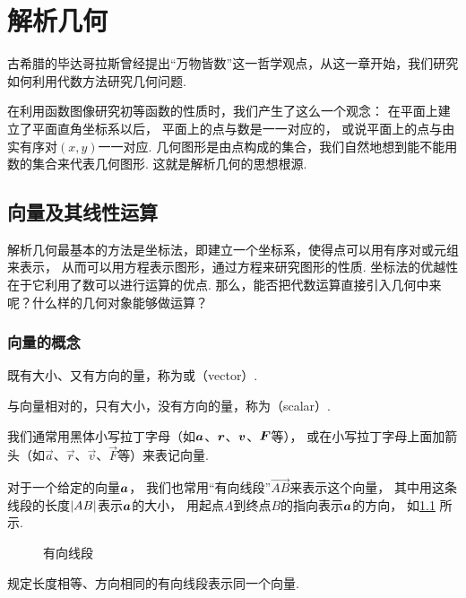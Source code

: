 \chapter{解析几何}
古希腊的毕达哥拉斯曾经提出“万物皆数”这一哲学观点，从这一章开始，我们研究如何利用代数方法研究几何问题.

在利用函数图像研究初等函数的性质时，我们产生了这么一个观念：
在平面上建立了平面直角坐标系以后，
平面上的点与数是一一对应的，
或说平面上的点与由实有序对\((x,y)\)一一对应.
几何图形是由点构成的集合，我们自然地想到能不能用数的集合来代表几何图形.
这就是解析几何的思想根源.


\section{向量及其线性运算}
解析几何最基本的方法是坐标法，即建立一个坐标系，使得点可以用有序对或元组来表示，
从而可以用方程表示图形，通过方程来研究图形的性质.
坐标法的优越性在于它利用了数可以进行运算的优点.
那么，能否把代数运算直接引入几何中来呢？什么样的几何对象能够做运算？

\subsection{向量的概念}
既有大小、又有方向的量，称为或（vector）.

与向量相对的，只有大小，没有方向的量，称为（scalar）.

我们通常用黑体小写拉丁字母（如\(\boldsymbol{a}\)、\(\boldsymbol{r}\)、\(\boldsymbol{v}\)、\(\boldsymbol{F}\)等），
或在小写拉丁字母上面加箭头（如\(\vec{a}\)、\(\vec{r}\)、\(\vec{v}\)、\(\vec{F}\)等）来表记向量.

对于一个给定的向量\(\boldsymbol{a}\)，
我们也常用“有向线段”\(\vec{AB}\)来表示这个向量，
其中用这条线段的长度\(\abs{AB}\)表示\(\boldsymbol{a}\)的大小，
用起点\(A\)到终点\(B\)的指向表示\(\boldsymbol{a}\)的方向，
如\cref{figure:解析几何.有向线段} 所示.
\begin{figure}[ht]
\centering
{}
\caption{有向线段}
\label{figure:解析几何.有向线段}
\end{figure}

规定长度相等、方向相同的有向线段表示同一个向量.

